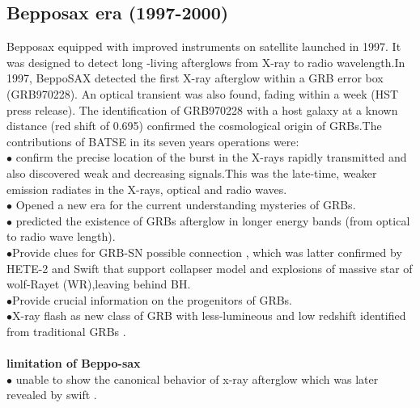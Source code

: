 \subsection{Bepposax era (1997-2000)}
Bepposax equipped with improved instruments on satellite launched in 1997. It was designed to detect long -living afterglows from X-ray to  radio wavelength.In 1997, BeppoSAX detected the first X-ray afterglow within a GRB error box (GRB970228). An optical transient was also found, fading within a week (HST press release). The identification of GRB970228 with a host galaxy at a known distance (red shift of 0.695) confirmed the cosmological origin of GRBs.The contributions of BATSE in its seven years operations were:\\
$\bullet$ confirm the precise location of the burst in the X-rays rapidly transmitted  and also discovered weak and decreasing signals.This was the late-time, weaker emission radiates in the X-rays, optical and radio waves. \\
$\bullet$ Opened a new era for the current understanding  mysteries of GRBs.\\
$\bullet$ predicted the existence of GRBs afterglow in longer energy bands (from optical to radio wave length).\\
$\bullet$Provide clues for GRB-SN possible connection , which was latter confirmed by
HETE-2 and Swift that support collapser model and explosions of massive star
of wolf-Rayet (WR),leaving behind BH.\\
$\bullet$Provide crucial information on the progenitors of GRBs.\\
$\bullet$X-ray flash as new class of GRB with less-lumineous and low redshift identified from traditional GRBs \citep{4} \citep{7}.\\\\
\textbf{limitation of Beppo-sax}\\
$\bullet$ unable to show the canonical behavior of x-ray afterglow which was later revealed by swift \citep{5}.\\\\
